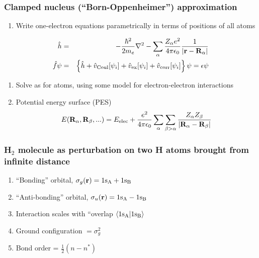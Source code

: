 \documentclass[11pt]{article}
\begin{document}
\subsubsection{Clamped nucleus (``Born-Oppenheimer'') approximation}
\label{sec:orgfd2e49c}
\begin{enumerate}
\item Write one-electron equations parametrically in terms of positions of  all atoms
\end{enumerate}
\begin{eqnarray}
\hat h & = & -\frac{\hbar^2}{2m_e}\nabla^2-\sum_\alpha \frac{Z_\alpha
          e^2}{4\pi\epsilon_0}\frac{1}{|{\bf r}-{\bf R}_\alpha|} \\
\hat f\psi & = & \left\{\hat h + \hat v_\mathrm{Coul}[\psi_i] + \hat
            v_\mathrm{ex}[\psi_i]+\hat v_\mathrm{corr}[\psi_i] \right\}\psi=\epsilon\psi
\end{eqnarray}
\begin{enumerate}
\item Solve as for atoms, using some model for electron-electron interactions
\item Potential energy surface (PES)
\[ E({\bf R}_\alpha, {\bf
            R}_\beta,...)=E_\mathrm{elec}+\frac{e^2}{4\pi\epsilon_0}\sum_\alpha\sum_{\beta>\alpha}\frac{Z_\alpha
            Z_\beta}{|{\bf R}_\alpha-{\bf R}_\beta|} \]
\end{enumerate}
\subsubsection{H\(_2\) molecule as perturbation on two H atoms brought from infinite distance}
\label{sec:org75f9408}
\begin{enumerate}
\item ``Bonding'' orbital, \(\sigma_g({\bf r}) = 1{\rm s_A}+1{\rm s_B}\)
\item ``Anti-bonding'' orbital, \(\sigma_u({\bf r}) = 1{\rm s_A}-1{\rm s_B}\)
\item Interaction scales with ``overlap \(\langle 1{\rm s_A} | 1{\rm
            s_B} \rangle\)
\item Ground configuration \(=\sigma_g^2\)
\item Bond order = \(\frac{1}{2}(n-n^*)\)
\end{enumerate}
\end{document}
